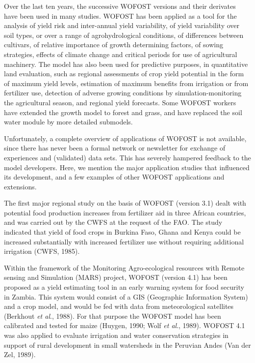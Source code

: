 Over the last ten years, the successive WOFOST versions and their derivates have been
used in many studies. WOFOST has been applied as a tool for the analysis of yield risk
and inter-annual yield variability, of yield variability over soil types, or over a range of
agrohydrological conditions, of differences between cultivars, of relative importance of
growth determining factors, of sowing strategies, effects of climate change and critical
periods for use of agricultural machinery. The model has also been used for predictive
purposes, in quantitative land evaluation, such as regional assessments of crop yield
potential in the form of maximum yield levels, estimation of maximum benefits from
irrigation or from fertilizer use, detection of adverse growing conditions by 
simulation-monitoring the agricultural season, and regional yield forecasts. Some WOFOST 
workers have extended the growth model to forest and grass, and have replaced the soil water
module by more detailed submodels.

Unfortunately, a complete overview of applications of WOFOST is not available, since
there has never been a formal network or newsletter for exchange of experiences and
(validated) data sets. This has severely hampered feedback to the model developers. Here,
we mention the major application studies that influenced its development, and a few
examples of other WOFOST applications and extensions.

The first major regional study on the basis of WOFOST (version 3.1) dealt with potential
food production increases from fertilizer aid in three African countries, and was carried
out by the CWFS at the request of the FAO. The study indicated that yield of food crops
in Burkina Faso, Ghana and Kenya could be increased substantially with increased
fertilizer use without requiring additional irrigation (CWFS, 1985).

Within the framework of the Monitoring Agro-ecological resources with Remote sensing
and Simulation (MARS) project, WOFOST (version 4.1) has been proposed as a yield
estimating tool in an early warning system for food security in Zambia. This system
would consist of a GIS (Geographic Information System) and a crop model, and would be
fed with data from meteorological satellites (Berkhout {\it et al}., 1988). For that purpose the
WOFOST model has been calibrated and tested for maize (Huygen, 1990; Wolf {\it et al}.,
1989). WOFOST 4.1 was also applied to evaluate irrigation and water conservation 
strategies in support of rural development in small watersheds in the Peruvian Andes 
(Van der Zel, 1989).

